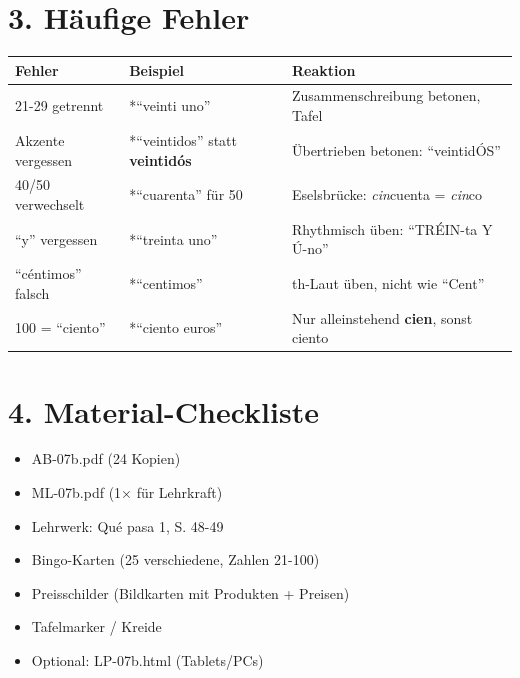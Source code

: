 \documentclass[11pt, a4paper]{article}
\newcommand{\fachfarbe}{spanisch}
\newcommand{\sequenz}{07}
\newcommand{\block}{b}
\newcommand{\lerngruppengroesse}{24}
\newcommand{\es}[1]{\textcolor{\fachfarbe}{\textbf{#1}}}
\begin{document}
\section*{3. Häufige Fehler}

\begin{fehlerbox}
\begin{tabularx}{\textwidth}{|l|X|X|}
\hline
\textbf{Fehler} & \textbf{Beispiel} & \textbf{Reaktion} \\
\hline
21-29 getrennt & *``veinti uno'' & Zusammenschreibung betonen, Tafel \\
\hline
Akzente vergessen & *``veintidos'' statt \es{veintidós} & Übertrieben betonen: ``veintidÓS'' \\
\hline
40/50 verwechselt & *``cuarenta'' für 50 & Eselsbrücke: \textit{cin}cuenta = \textit{cin}co \\
\hline
``y'' vergessen & *``treinta uno'' & Rhythmisch üben: ``TRÉIN-ta Y Ú-no'' \\
\hline
``céntimos'' falsch & *``centimos'' & th-Laut üben, nicht wie ``Cent'' \\
\hline
100 = ``ciento'' & *``ciento euros'' & Nur alleinstehend \es{cien}, sonst ciento \\
\hline
\end{tabularx}
\end{fehlerbox}


\section*{4. Material-Checkliste}

\begin{materialbox}
\begin{itemize}[label=$\square$]
    \item AB-\sequenz\block.pdf (\lerngruppengroesse{} Kopien)
    \item ML-\sequenz\block.pdf (1× für Lehrkraft)
    \item Lehrwerk: Qué pasa 1, S. 48-49
    \item Bingo-Karten (25 verschiedene, Zahlen 21-100)
    \item Preisschilder (Bildkarten mit Produkten + Preisen)
    \item Tafelmarker / Kreide
    \item Optional: LP-\sequenz\block.html (Tablets/PCs)
\end{itemize}
\end{materialbox}
\end{document}
